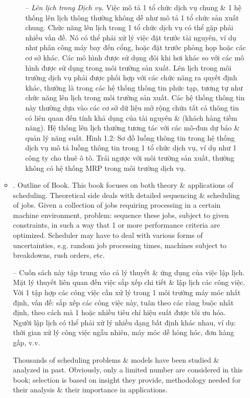 \documentclass{article}
\begin{document}
\begin{itemize}
\begin{itemize}
\begin{itemize}
            -- {\it Lên lịch trong Dịch vụ.} Việc mô tả 1 tổ chức dịch vụ chung \& 1 hệ thống lên lịch thông thường không dễ như mô tả 1 tổ chức sản xuất chung. Chức năng lên lịch trong 1 tổ chức dịch vụ có thể gặp phải nhiều vấn đề. Nó có thể phải xử lý việc đặt trước tài nguyên, ví dụ như phân công máy bay đến cổng, hoặc đặt trước phòng họp hoặc các cơ sở khác. Các mô hình được sử dụng đôi khi hơi khác so với các mô hình được sử dụng trong môi trường sản xuất. Lên lịch trong môi trường dịch vụ phải được phối hợp với các chức năng ra quyết định khác, thường là trong các hệ thống thông tin phức tạp, tương tự như chức năng lên lịch trong môi trường sản xuất. Các hệ thống thông tin này thường dựa vào các cơ sở dữ liệu mở rộng chứa tất cả thông tin có liên quan đến tính khả dụng của tài nguyên \& (khách hàng tiềm năng). Hệ thống lên lịch thường tương tác với các mô-đun dự báo \& quản lý năng suất. {\sf Hình 1.2: Sơ đồ luồng thông tin trong hệ thống dịch vụ} mô tả luồng thông tin trong 1 tổ chức dịch vụ, ví dụ như 1 công ty cho thuê ô tô. Trái ngược với môi trường sản xuất, thường không có hệ thống MRP trong môi trường dịch vụ.
        \end{itemize}
        \item {. Outline of Book.} This book focuses on both theory \& applications of scheduling. Theoretical side deals with detailed sequencing \& scheduling of jobs. Given a collection of jobs requiring processing in a certain machine environment, problem: sequence these jobs, subject to given constraints, in such a way that 1 or more performance criteria are optimized. Scheduler may have to deal with various forms of uncertainties, e.g. random job processing times, machines subject to breakdowns, rush orders, etc.
        
        -- Cuốn sách này tập trung vào cả lý thuyết \& ứng dụng của việc lập lịch. Mặt lý thuyết liên quan đến việc sắp xếp chi tiết \& lập lịch các công việc. Với 1 tập hợp các công việc cần xử lý trong 1 môi trường máy móc nhất định, vấn đề: sắp xếp các công việc này, tuân theo các ràng buộc nhất định, theo cách mà 1 hoặc nhiều tiêu chí hiệu suất được tối ưu hóa. Người lập lịch có thể phải xử lý nhiều dạng bất định khác nhau, ví dụ: thời gian xử lý công việc ngẫu nhiên, máy móc dễ hỏng hóc, đơn hàng gấp, v.v.
        
        Thousands of scheduling problems \& models have been studied \& analyzed in past. Obviously, only a limited number are considered in this book; selection is based on insight they provide, methodology needed for their analysis \& their importance in applications.
        

\end{itemize}
\end{itemize}
\end{document}

